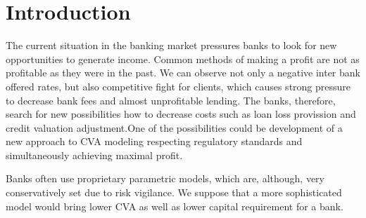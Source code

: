 \documentclass{amsart}
\theoremstyle{definition}\newtheorem{definition}[theorem]{Definition}
\theoremstyle{remark}\newtheorem{remark}[theorem]{Remark}
\begin{document}
\section{Introduction}


The current situation in the banking market pressures banks to look for new opportunities to generate income.
Common methods of making a profit are not as profitable as they were in the past.%
We can observe not only a negative inter bank offered rates, but also competitive fight for clients, which causes strong pressure to decrease bank fees and almost unprofitable lending.
The banks, therefore,  search for new possibilities how to decrease costs such as loan loss provission and credit valuation adjustment.One of the possibilities could be development of a new approach to CVA modeling respecting regulatory standards and simultaneously achieving maximal profit.

Banks often use proprietary parametric models, which are, although, very conservatively set due to risk vigilance.
We suppose that a more sophisticated model would bring lower CVA as well as lower capital requirement for a bank.
\end{document}
